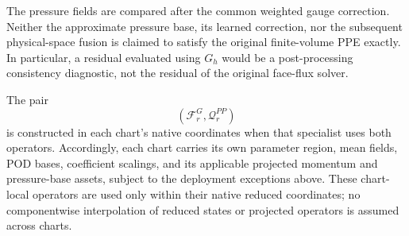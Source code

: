 The pressure fields are compared after the common weighted gauge correction. Neither the approximate pressure base, its learned correction, nor the subsequent physical-space fusion is claimed to satisfy the original finite-volume PPE exactly. In particular, a residual evaluated using $G_h$ would be a post-processing consistency diagnostic, not the residual of the original face-flux solver.

The pair
\begin{equation}
    \left(
        \mathcal F_r^G,
        \mathcal Q_r^{PP}
    \right)
\end{equation}
is constructed in each chart's native coordinates when that specialist uses both operators.
Accordingly, each chart carries its own parameter region, mean fields,
POD bases, coefficient scalings, and its applicable projected momentum and
pressure-base assets, subject to the deployment exceptions above.
These chart-local operators are used only within their native reduced
coordinates; no componentwise interpolation of reduced states or projected
operators is assumed across charts.
